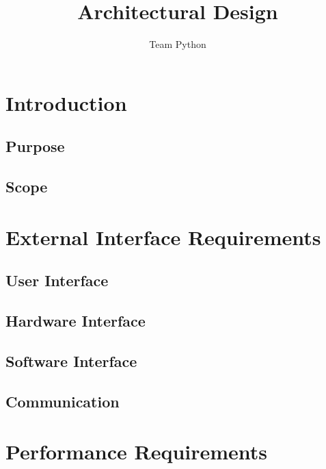 \documentclass[11pt]{article}
\author{Team Python}
\title{Architectural Design}
\begin{document}
	\setlength{\parskip}{6pt}
	

	\newpage
	
	\section{Introduction}
    \subsection{Purpose}
	\subsection{Scope}
	
	\section{External Interface Requirements}
	\subsection{User Interface}
	\subsection{Hardware Interface}
	\subsection{Software Interface}
	\subsection{Communication}
	
	\section{Performance Requirements}
\end{document}
